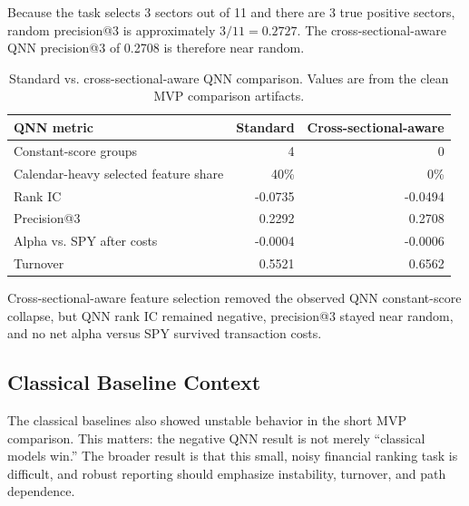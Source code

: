 \documentclass[11pt]{article}
\makeatletter
\newcommand{\keyresult}{Cross-sectional-aware feature selection removed the observed QNN constant-score collapse, but QNN rank IC remained negative, precision@3 stayed near random, and no net alpha versus SPY survived transaction costs.}
\makeatother
\begin{document}
Because the task selects 3 sectors out of 11 and there are 3 true positive sectors, random precision@3 is approximately \(3/11=0.2727\). The cross-sectional-aware QNN precision@3 of 0.2708 is therefore near random.

\begin{table}[H]
\centering
\caption{Standard vs. cross-sectional-aware QNN comparison. Values are from the clean MVP comparison artifacts.}
\begin{tabular}{@{}lrr@{}}
\toprule
\textbf{QNN metric} & \textbf{Standard} & \textbf{Cross-sectional-aware} \\
\midrule
Constant-score groups & 4 & 0 \\
Calendar-heavy selected feature share & 40\% & 0\% \\
Rank IC & -0.0735 & -0.0494 \\
Precision@3 & 0.2292 & 0.2708 \\
Alpha vs. SPY after costs & -0.0004 & -0.0006 \\
Turnover & 0.5521 & 0.6562 \\
\bottomrule
\end{tabular}
\end{table}

\keyresult{}

\subsection{Classical Baseline Context}

The classical baselines also showed unstable behavior in the short MVP comparison. This matters: the negative QNN result is not merely ``classical models win.'' The broader result is that this small, noisy financial ranking task is difficult, and robust reporting should emphasize instability, turnover, and path dependence.
\end{document}
